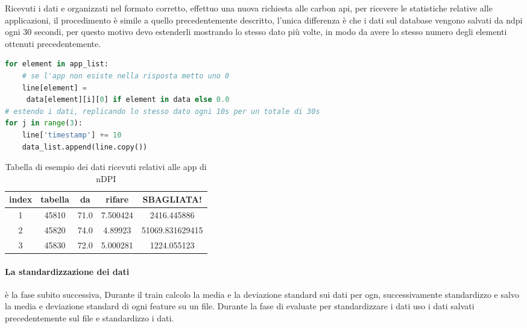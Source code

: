 Ricevuti i dati e organizzati nel formato corretto, effettuo una nuova richiesta alle carbon api, per ricevere le statistiche relative alle applicazioni, il procedimento è simile a quello precedentemente descritto, l'unica differenza è che i dati sul database vengono salvati da ndpi ogni 30 secondi, per questo motivo devo estenderli mostrando lo stesso dato più volte, in modo da avere lo stesso numero degli elementi ottenuti precedentemente.

\begin{lstlisting}[language=Python]
for element in app_list:
    # se l'app non esiste nella risposta metto uno 0
    line[element] =
     data[element][i][0] if element in data else 0.0
# estendo i dati, replicando lo stesso dato ogni 10s per un totale di 30s
for j in range(3):
    line['timestamp'] += 10
    data_list.append(line.copy())
\end{lstlisting}

\begin{table}[]

    \begin{tabular}{||c c c c c||} 
    \hline
    index & tabella  & da & rifare & SBAGLIATA! \\ [0.5ex] 
    \hline\hline
    1 & 45810 & 71.0 & 7.500424 & 2416.445886 \\ 
    \hline
    2 & 45820 & 74.0 & 4.89923 & 51069.831629415 \\
    \hline
    3 & 45830 & 72.0 & 5.000281 & 1224.055123 \\
    \hline
    \end{tabular}
    \caption{Tabella di esempio dei dati ricevuti relativi alle app di nDPI}
    \label{table:tabella_dati_2}
    \end{table}


\paragraph{La standardizzazione dei dati} è la fase subito successiva, 
Durante il train calcolo la media e la deviazione standard sui dati per ogn, successivamente standardizzo e salvo la media e deviazione standard di ogni feature su un file.
Durante la fase di evaluate per standardizzare i dati uso i dati salvati precedentemente sul file e standardizzo i dati.

